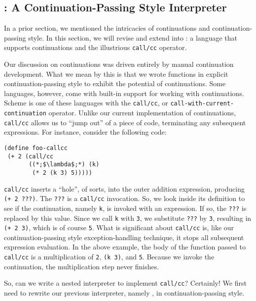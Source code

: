 
\clearpage
\subsection*{: A Continuation-Passing Style Interpreter}
In a prior section, we mentioned the intricacies of continuations and continuation-passing style. In this section, we will revise and extend  into : a language that supports continuations and the illustrious \texttt{call/cc} operator.

Our discussion on continuations was driven entirely by manual continuation development. What we mean by this is that we wrote functions in explicit continuation-passing style to exhibit the potential of continuations. Some languages, however, come with built-in support for working with continuations. Scheme is one of these languages with the \texttt{call/cc}, or \texttt{call-with-current-continuation} operator. Unlike our current implementation of continuations, \texttt{call/cc} allows us to ``jump out'' of a piece of code, terminating any subsequent expressions. For instance, consider the following code:
\begin{cl}[]{}\begin{lstlisting}[language=MyScheme]
(define foo-callcc
 (+ 2 (call/cc
       ((*;$\lambda$;*) (k)
        (* 2 (k 3) 5)))))
\end{lstlisting}\end{cl}
\texttt{call/cc} inserts a ``hole'', of sorts, into the outer addition expression, producing \texttt{(+ 2 ???)}. The \texttt{???} is a \texttt{call/cc} invocation. So, we look inside its definition to see if the continuation, namely \texttt{k}, is invoked with an expression. If so, the \texttt{???} is replaced by this value. Since we call \texttt{k} with \texttt{3}, we substitute \texttt{???} by \texttt{3}, resulting in \texttt{(+ 2 3)}, which is of course \texttt{5}. What is significant about \texttt{call/cc} is, like our continuation-passing style exception-handling technique, it stops all subsequent expression evaluation. In the above example, the body of the function passed to \texttt{call/cc} is a multiplication of \texttt{2}, \texttt{(k 3)}, and \texttt{5}. Because we invoke the continuation, the multiplication step never finishes. 

So, can we write a nested interpreter to implement \texttt{call/cc}? Certainly! We first need to rewrite our previous interpreter, namely , in continuation-passing style.

